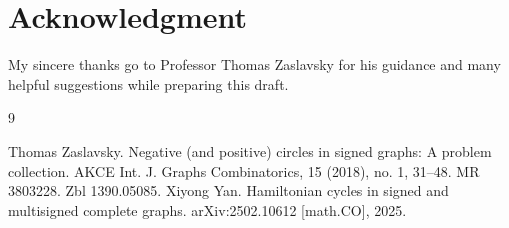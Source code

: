 \documentclass[12pt]{amsart}
\theoremstyle{plain}
\theoremstyle{definition}%
\begin{document}
\newpage

\section{Acknowledgment}

My sincere thanks go to Professor Thomas Zaslavsky for his guidance and many helpful suggestions while preparing this draft.




\begin{thebibliography}{9}


  Thomas Zaslavsky. Negative (and positive) circles in signed graphs: A problem collection.  AKCE Int. J. Graphs Combinatorics, 15 (2018), no. 1, 31--48. MR 3803228. Zbl 1390.05085.\label{eq:example}
 Xiyong Yan. Hamiltonian cycles in signed and multisigned complete graphs.
arXiv:2502.10612 [math.CO], 2025.

\end{thebibliography}
\end{document}

